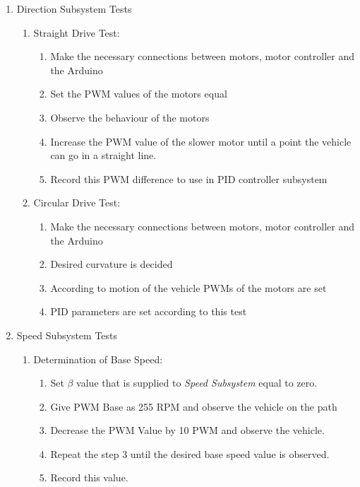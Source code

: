 \documentclass[a4paper,12pt]{article}
\begin{document}
\begin{enumerate}
\begin{enumerate}
		\end{enumerate}
		
	
	\item {Direction Subsystem Tests}
	\begin{enumerate}
	
		\item Straight Drive Test: \label{test:a1}	
			
			\begin{enumerate}
				\item Make the necessary connections between motors, motor controller and the Arduino  
				\item Set the PWM values of the motors equal  
				\item Observe the behaviour of the motors  
				\item Increase the PWM value of the slower motor until a point the vehicle can go in a straight line.
				\item Record this PWM difference to use in PID controller subsystem
			\end{enumerate}
				
			
		
		\item Circular Drive Test: \label{test:b1}	
			\begin{enumerate}
				\item Make the necessary connections between motors, motor controller and the Arduino  
				\item Desired curvature is decided  
				\item  According to motion of the vehicle PWMs of the motors are set  
				\item  PID parameters are set according to this test
			\end{enumerate}
		
		
	\end{enumerate}
	
	
	
	\item {Speed Subsystem Tests}
	\begin{enumerate}
		\item Determination of Base Speed: \label{test:a2}	
		\begin{enumerate}
			\item Set $\beta$ value that is supplied to \textit{Speed Subsystem} equal to zero.
			\item Give PWM Base as 255 RPM and observe the vehicle on the path 
			\item Decrease the PWM Value by 10 PWM and observe the vehicle.
			\item Repeat the step 3 until the desired base speed value is observed.
			\item Record this value.
		\end{enumerate}
		

\end{enumerate}
\end{enumerate}
\end{document}
